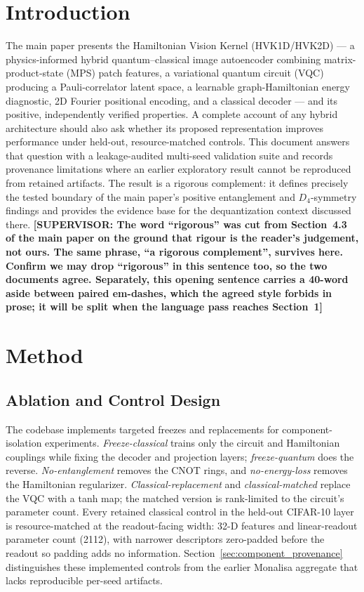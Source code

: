 \documentclass[11pt]{article}
\begin{document}
\section{Introduction}
The main paper presents the Hamiltonian Vision Kernel (HVK1D/HVK2D) --- a physics-informed hybrid quantum--classical image autoencoder combining matrix-product-state (MPS) patch features, a variational quantum circuit (VQC) producing a Pauli-correlator latent space, a learnable graph-Hamiltonian energy diagnostic, 2D Fourier positional encoding, and a classical decoder --- and its positive, independently verified properties. A complete account of any hybrid architecture should also ask whether its proposed representation improves performance under held-out, resource-matched controls. This document answers that question with a leakage-audited multi-seed validation suite and records provenance limitations where an earlier exploratory result cannot be reproduced from retained artifacts. The result is a rigorous complement: it defines precisely the tested boundary of the main paper's positive entanglement and $D_4$-symmetry findings and provides the evidence base for the dequantization context discussed there. {\color{red}\textbf{[SUPERVISOR: The word ``rigorous'' was cut from Section~4.3 of the main paper on the ground that rigour is the reader's judgement, not ours. The same phrase, ``a rigorous complement'', survives here. Confirm we may drop ``rigorous'' in this sentence too, so the two documents agree. Separately, this opening sentence carries a 40-word aside between paired em-dashes, which the agreed style forbids in prose; it will be split when the language pass reaches Section~1]}}

\section{Method}

\subsection{Ablation and Control Design}
The codebase implements targeted freezes and replacements for component-isolation experiments. \emph{Freeze-classical} trains only the circuit and Hamiltonian couplings while fixing the decoder and projection layers; \emph{freeze-quantum} does the reverse. \emph{No-entanglement} removes the CNOT rings, and \emph{no-energy-loss} removes the Hamiltonian regularizer. \emph{Classical-replacement} and \emph{classical-matched} replace the VQC with a tanh map; the matched version is rank-limited to the circuit's parameter count. Every retained classical control in the held-out CIFAR-10 layer is resource-matched at the readout-facing width: 32-D features and linear-readout parameter count (2112), with narrower descriptors zero-padded before the readout so padding adds no information. Section~\ref{sec:component_provenance} distinguishes these implemented controls from the earlier Monalisa aggregate that lacks reproducible per-seed artifacts.
\end{document}
